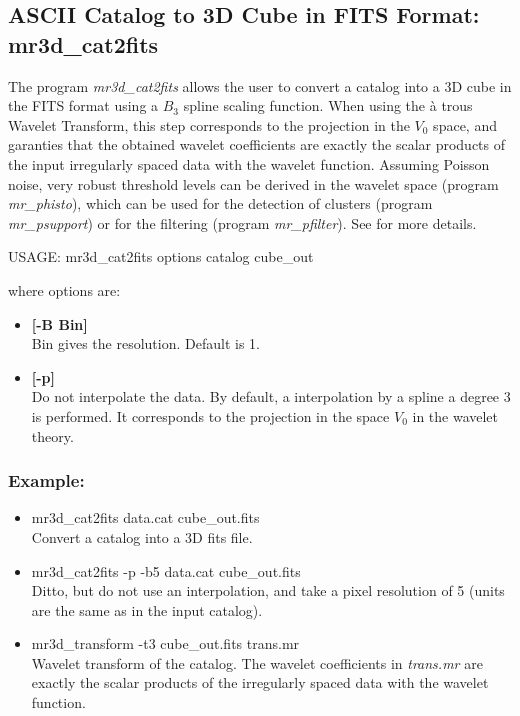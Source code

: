 \subsection{ASCII Catalog to 3D Cube in FITS Format: mr3d\_cat2fits}
\label{sect_cat2fits}

The program {\em mr3d\_cat2fits} allows the user to convert a catalog
into a 3D cube in the FITS format using a $B_3$ spline scaling function.
When using the \`a trous Wavelet Transform, this step corresponds to
the projection in the $V_0$ space, and garanties that the obtained 
wavelet coefficients are exactly the scalar products of the input 
irregularly spaced data with the wavelet function. Assuming Poisson 
noise, very robust threshold levels can be derived 
in the wavelet space (program {\em mr\_phisto}), which can be used for the 
detection of clusters (program {\em mr\_psupport}) or for the
filtering (program {\em mr\_pfilter}). See \cite{starck:book02} for
more details.

{\bf
\begin{center}
 USAGE: mr3d\_cat2fits options catalog cube\_out
\end{center}}
where options are:
\begin{itemize}
\itemsep=0.1truecm
\item {\bf  [-B Bin] } \\
 Bin gives the resolution. Default is 1. 
\item {\bf  [-p] } \\
Do not interpolate the data. By default, a interpolation by a spline
a degree 3 is performed. It corresponds to the projection in the 
space $V_0$ in the wavelet theory.
\end{itemize}

\subsubsection*{Example:}
\begin{itemize}
\item mr3d\_cat2fits data.cat cube\_out.fits \\
Convert a catalog into a 3D fits file.
\item mr3d\_cat2fits -p -b5 data.cat cube\_out.fits \\
Ditto, but do not use an interpolation, and take a pixel resolution of 5
(units are the same as in the input catalog).
\item mr3d\_transform -t3 cube\_out.fits trans.mr\\
Wavelet transform of the catalog. The wavelet coefficients in {\em trans.mr}
are exactly the scalar products of the irregularly spaced data with
the wavelet function. 
\end{itemize}


